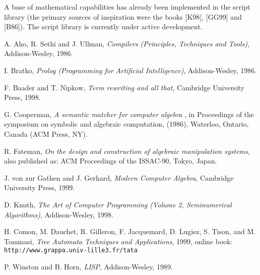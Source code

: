 \documentclass{llncs}
\begin{document}
A base of mathematical capabilities has already been implemented in the script
library (the primary sources of inspiration were the books [K98], [GG99] and
[B86]). The script library is currently under active development.


\begin{thebibliography}{1}

 A. Aho, R. Sethi and J. Ullman, \emph{Compilers (Principles, Techniques and Tools)}, Addison-Wesley, 1986.


 I. Bratko, \emph{Prolog (Programming for Artificial Intelligence)}, Addison-Wesley, 1986.


 F. Baader and T. Nipkow, \emph{Term rewriting and all that}, Cambridge University Press, 1998.


 G. Cooperman, \emph{A semantic matcher for computer algebra }, in Proceedings of the symposium on symbolic and algebraic computation, (1986), Waterloo, Ontario, Canada (ACM Press, NY).


 R. Fateman, \emph{On the design and construction of algebraic manipulation systems}, also published as: ACM Proceedings of the ISSAC-90, Tokyo, Japan.


 J. von zur Gathen and J. Gerhard, \emph{Modern Computer Algebra}, Cambridge University Press, 1999.


 D. Knuth, \emph{The Art of Computer Programming (Volume 2, Seminumerical Algorithms)}, Addison-Wesley, 1998.




 H. Comon, M. Dauchet, R. Gilleron, F. Jacquemard, D. Lugiez, S. Tison, and M. Tommasi, \emph{Tree Automata Techniques and Applications}, 1999, online book: {\small \verb|http://www.grappa.univ-lille3.fr/tata|}




 P. Winston and B. Horn, \emph{LISP}, Addison-Wesley, 1989.


\end{thebibliography}
\end{document}
